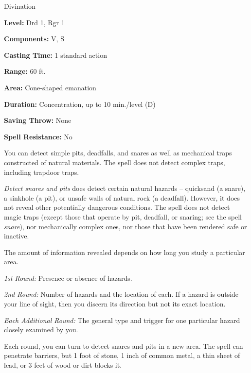 
Divination

\textbf{Level:} Drd 1, Rgr 1

\textbf{Components:} V, S

\textbf{Casting Time:} 1 standard action

\textbf{Range:} 60 ft.

\textbf{Area:} Cone-shaped emanation

\textbf{Duration:} Concentration, up to 10 min./level (D)

\textbf{Saving Throw:} None

\textbf{Spell Resistance:} No

You can detect simple pits, deadfalls, and snares as well as mechanical traps constructed 
of natural materials. The spell does not detect complex traps, including trapdoor 
traps.

\textit{Detect snares and pits} does detect certain natural hazards -- quicksand 
(a snare), a sinkhole (a pit), or unsafe walls of natural rock (a deadfall). However, 
it does not reveal other potentially dangerous conditions. The spell does not detect 
magic traps (except those that operate by pit, deadfall, or snaring; see the spell 
\textit{snare}), nor mechanically complex ones, nor those that have been rendered 
safe or inactive.

The amount of information revealed depends on how long you study a particular area.

\textit{1st Round:} Presence or absence of hazards.

\textit{2nd Round:} Number of hazards and the location of each. If a hazard is 
outside your line of sight, then you discern its direction but not its exact location.

\textit{Each Additional Round:} The general type and trigger for one particular 
hazard closely examined by you.

Each round, you can turn to detect snares and pits in a new area. The spell can 
penetrate barriers, but 1 foot of stone, 1 inch of common metal, a thin sheet of 
lead, or 3 feet of wood or dirt blocks it.

